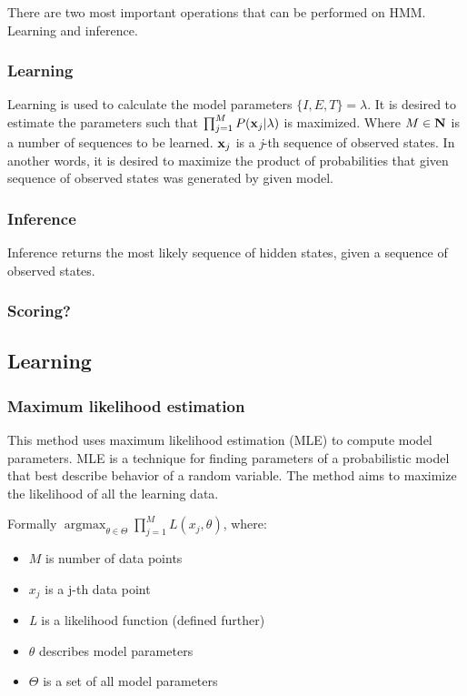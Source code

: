 \documentclass[thesis=B,english]{FITthesis}[2012/06/26]
\DeclareMathOperator*{\argmax}{argmax} %
\begin{document}
There are two most important operations that can be performed on HMM. Learning and inference.

\subsubsection{Learning}

Learning is used to calculate the model parameters $\{I, E, T\} = \lambda$. It is desired to estimate the parameters such that $\prod_{j=1}^{M} P(\textbf x_j | \lambda )$ is maximized. Where $M \in \textbf N$ is a number of sequences to be learned. $\textbf x_j$ is a \emph{j}-th sequence of observed states. In another words, it is desired to maximize the product of probabilities that given sequence of observed states was generated by given model.

\subsubsection{Inference}

Inference returns the most likely sequence of hidden states, given a sequence of observed states.

\subsubsection{Scoring?}

\subsection{Learning}

\subsubsection{Maximum likelihood estimation}

This method uses maximum likelihood estimation (MLE) to compute model parameters. MLE is a technique for finding parameters of a probabilistic model that best describe behavior of a random variable. The method aims to maximize the likelihood of all the learning data.

Formally $\argmax_{\theta \in \Theta} \prod_{j=1}^{M} L(x_j, \theta)$, where:

\begin{itemize}

\item $M$ is number of data points
\item $x_j$ is a j-th data point
\item \emph{L} is a likelihood function (defined further)
\item $\theta$ describes model parameters
\item $\Theta$ is a set of all model parameters

\end{itemize}
\end{document}

